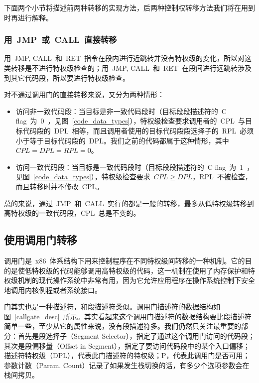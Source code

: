 下面两个小节将描述前两种转移的实现方法，后两种控制权转移方法我们将在用到时再进行解释。

\subsubsection{用~JMP~或~CALL~直接转移}

用~JMP, CALL~和~RET~指令在段内进行近跳转并没有特权级的变化，所以对这类转移是不进行特权级检查的；用~JMP, CALL~和~RET~在段间进行远跳转涉及到其它代码段，所以要进行特权级检查。

对不通过调用门的直接转移来说，又分为两种情形：

\begin{itemize}
\item{访问非一致代码段}：当目标是非一致代码段时（目标段段描述符的~C flag~为~0~，见图~\ref{code_data_types}），特权级检查要求调用者的~CPL~与目标代码段的~DPL~相等，而且调用者使用的目标代码段段选择子的~RPL~必须小于等于目标代码段的~DPL。我们之前的代码都属于这种情形，其中~$CPL=DPL=RPL=0$。
\item{访问一致代码段}：当目标是一致代码段时（目标段段描述符的~C flag~为~1~，见图~\ref{code_data_types}），特权级检查要求~$CPL \ge DPL$，RPL~不被检查，而且转移时并不修改~CPL。
\end{itemize}

总的来说，通过~JMP~和~CALL~实行的都是一般的转移，最多从低特权级转移到高特权级的一致代码段，CPL~总是不变的。

\subsection{使用调用门转移}

调用门是~x86~体系结构下用来控制程序在不同特权级间转移的一种机制。它的目的是使低特权级的代码能够调用高特权级的代码，这一机制在使用了内存保护和特权级机制的现代操作系统中非常有用，因为它允许应用程序在操作系统控制下安全地调用内核例程或者系统接口。


门其实也是一种描述符，和段描述符类似。调用门描述符的数据结构如图~\ref{callgate_desc}~所示。其实看起来这个调用门描述符的数据结构要比段描述符简单一些，至少从它的属性来说，没有段描述符多。我们仍然只关注最重要的部分：首先是段选择子（Segment Selector），指定了通过这个调用门访问的代码段；其次是段偏移量（Offset in Segment），指定了要访问代码段中的某个入口偏移；描述符特权级（DPL），代表此门描述符的特权级；P，代表此调用门是否可用；参数计数（Param. Count）记录了如果发生栈切换的话，有多少个选项参数会在栈间拷贝。

